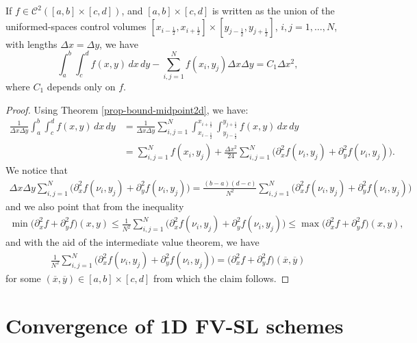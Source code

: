 \begin{corollary}
	\label{anexo-mdp-2d}
	If $f\in \mathcal{C}^2([a,b]\times[c,d])$, and $[a,b]\times[c,d]$ is written
	as the union of the uniformed-spaces control volumes $[x_{i-\frac{1}{2}},x_{i+\frac{1}{2}}] \times  [y_{j-\frac{1}{2}},y_{j+\frac{1}{2}}]$,
	$i,j=1, \ldots, N$,
	with lengths $\Delta x= \Delta y$, we have
	\begin{equation}
	\int_{a}^{b}\int_{c}^{d}
	{f(x,y)\,dx \,dy}-\sum_{i,j=1}^Nf(x_i,y_j) {\Delta x \Delta y} = C_1 \Delta x^2, 
\end{equation}
where $C_1$ depends only on $f$.
\end{corollary}
\begin{proof}
Using Theorem \ref{prop-bound-midpoint2d}, we have:
\begin{align*}
\frac{1}{\Delta x \Delta y}
\int_{a}^{b}\int_{c}^{d} {f(x,y)\,dx \,dy} &=
\frac{1}{\Delta x \Delta y} \sum_{i,j=1}^N
\int_{x_{i-\frac{1}{2}}}^{x_{i+\frac{1}{2}}}
\int_{y_{j-\frac{1}{2}}}^{y_{j+\frac{1}{2}}} {f(x,y)\,dx \,dy}\\
 &= 
\sum_{i,j=1}^N {f(x_i,y_j)} +
\frac{\Delta x^2}{24} \sum_{i,j=1}^N  \bigg({\partial^2_x f(\nu_i,y_j)}+{\partial^2_y f(\nu_i,y_j)}\bigg).
\end{align*}
We notice that
\begin{align*}
{\Delta x \Delta y}
\sum_{i,j=1}^N \bigg(\partial^2_x f(\nu_i,y_j)+\partial^2_y f(\nu_i,y_j)\bigg) = 
\frac{(b-a)(d-c)}{N^2}
\sum_{i,j=1}^N \bigg(\partial^2_x f(\nu_i,y_j)+\partial^2_y f(\nu_i,y_j)\bigg) 
\end{align*}
and we also point that from the inequality
\begin{align*}
	\min{ \big(\partial^2_x f+\partial^2_y f\big)(x,y)} \leq
	\frac{1}{N^2}
	\sum_{i,j=1}^N \bigg(\partial^2_x f(\nu_i,y_j)+\partial^2_y f(\nu_i,y_j)\bigg) 
	\leq \max{ \big(\partial^2_x f+\partial^2_y f\big)(x,y)},
\end{align*}
and with the aid of the intermediate value theorem, we have
\begin{align*}
	\frac{1}{N^2}
	\sum_{i,j=1}^N \bigg(\partial^2_x f(\nu_i,y_j)+\partial^2_y f(\nu_i,y_j)\bigg) 
	= \big(\partial^2_x f+\partial^2_y f\big)(\overline{x},\overline{y}) 
\end{align*}
for some $(\overline{x},\overline{y}) \in [a,b]\times[c,d]$ from which the claim follows.
\end{proof}

\section{Convergence of 1D FV-SL schemes}
\label{convergence-1dfvsl}
